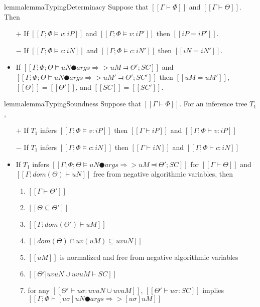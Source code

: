 \begin{restatable}{lemma}{lemmaTypingDeterminacy}
    \label{lemma:typing-determinacy}
    Suppose that $[[Γ ⊢ Φ]]$ and $[[Γ ⊢ Θ]]$. Then 
    \begin{itemize}
        \item [$+$] If $[[Γ; Φ ⊨ v : iP]]$ and $[[Γ; Φ ⊨ v : iP']]$ then $[[iP = iP']]$.
        \item [$-$] If $[[Γ; Φ ⊨ c : iN]]$ and $[[Γ; Φ ⊨ c : iN']]$ then $[[iN = iN']]$.
        \item If $[[Γ; Φ; Θ ⊨ uN ● args ⇒> uM ⫤ Θ'; SC]]$ and 
            $[[Γ; Φ; Θ ⊨ uN ● args ⇒> uM' ⫤ Θ'; SC']]$ then 
            $[[uM = uM']]$, $[[Θ]] = [[Θ']]$, and $[[SC]] =[[SC']]$.  
    \end{itemize}
\end{restatable}

\begin{restatable}{lemma}{lemmaTypingSoundness}
    \label{lemma:typing-soundness}
    Suppose that $[[Γ ⊢ Φ]]$.
    For an inference tree $T_1$,
    \hfill
    \begin{itemize}
        \item [$+$] If $T_1$ infers $[[Γ; Φ ⊨ v : iP]]$ then $[[Γ ⊢ iP]]$ and $[[Γ; Φ ⊢ v : iP]]$
        \item [$-$] If $T_1$ infers $[[Γ; Φ ⊨ c : iN]]$ then $[[Γ ⊢ iN]]$ and $[[Γ; Φ ⊢ c : iN]]$
        \item  If $T_1$ infers $[[Γ; Φ; Θ ⊨ uN ● args ⇒> uM ⫤ Θ'; SC]]$
                for $[[Γ ⊢ Θ]]$ and $[[Γ; dom(Θ) ⊢  uN]]$ free from negative algorithmic variables, 
                then
            \begin{enumerate}
                \item $[[Γ ⊢ Θ']]$
                \item $[[Θ ⊆ Θ']]$
                \item $[[Γ; dom(Θ') ⊢  uM]]$
                \item $[[dom(Θ) ∩ uv(uM) ⊆ uv uN]]$
                \item $[[uM]]$ is normalized and free from negative algorithmic variables
                \item $[[Θ'|uv uN ∪ uv uM ⊢ SC]]$
                \item for any $[[ Θ' ⊢ uσ : uv uN ∪ uv uM ]]$,
                    $[[ Θ' ⊢ uσ : SC ]]$ implies $[[ Γ ; Φ ⊢ [uσ]uN ● args ⇒> [uσ]uM ]]$
            \end{enumerate}
    \end{itemize}
\end{restatable}


